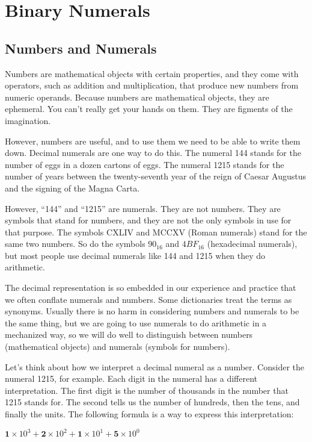 \chapter{Binary Numerals}
\label{ch:binary-numerals}
\section{Numbers and Numerals}
\label{sec:numbers-numerals}
Numbers are mathematical objects with certain properties,
and they come with operators, such as addition
and multiplication, that produce new numbers from numeric
operands.
Because numbers are mathematical objects, they are ephemeral.
You can't really get your hands on them.
They are figments of the imagination.

However, numbers are useful, and to use them
we need to be able to write them down.
Decimal numerals are one way to do this.
The numeral 144 stands for the number
of eggs in a dozen cartons of eggs.
The numeral 1215 stands for the number of
years between the twenty-seventh year of the reign
of Caesar Augustus and the signing of the Magna Carta.

However, ``144'' and ``1215'' are numerals.
They are not numbers. They are symbols that stand for numbers,
and they are not the only symbols in use for that purpose.
The symbols CXLIV and MCCXV (Roman numerals) stand for the same two numbers.
So do the symbols $90_{16}$ and $4BF_{16}$ (hexadecimal numerals),
but most people use decimal numerals like 144 and 1215 when they do arithmetic.

The decimal representation is so embedded in
our experience and practice that we often conflate
numerals and numbers. Some dictionaries treat the terms as synonyms.
Usually there is no harm in considering numbers and numerals
to be the same thing, but we are going to use numerals
to do arithmetic in a mechanized way, so we will
do well to distinguish between
numbers (mathematical objects)
and numerals (symbols for numbers).

Let's think about how we interpret a decimal numeral as a number.
Consider the numeral 1215, for example.
Each digit in the numeral has a different interpretation.
The first digit is the number of thousands in the number
that 1215 stands for. The second tells us the number
of hundreds, then the tens, and finally the units.
The following formula is a way to express this interpretation:
\begin{center}
$\textbf{1} \times 10^3 + \textbf{2} \times 10^2 + \textbf{1} \times 10^1 + \textbf{5} \times 10^0$
\end{center}

